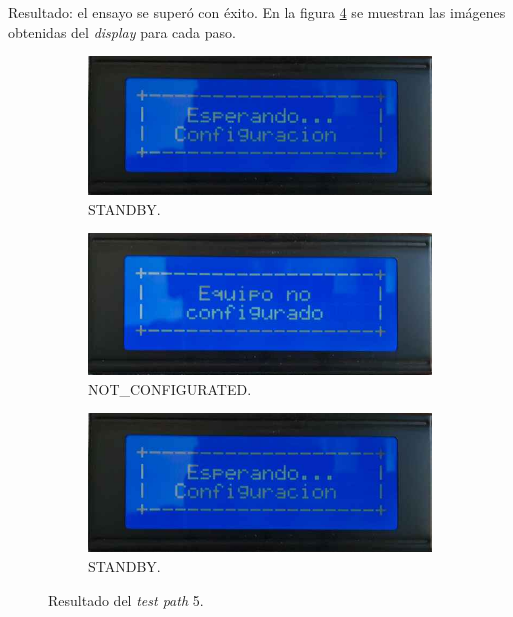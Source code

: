 Resultado: el ensayo se superó con éxito. En la figura \ref{fig:pruConf_5_res} se muestran las imágenes obtenidas del \textit{display} para cada paso.

\begin{figure}[!htpb]
     \centering
     \begin{subfigure}[b]{0.4\textwidth}
         \centering
         \includegraphics[width=1.1\textwidth]{./Figures/Esp_Conf.jpeg}
         \caption{STANDBY.}
         \label{fig:pruConf_5_1}
     \end{subfigure}
           \hfill
     \begin{subfigure}[b]{0.4\textwidth}
         \centering
         \includegraphics[width=1.1\textwidth]{./Figures/Eq_no_conf.jpeg}
         \caption{NOT\_CONFIGURATED.}
         \label{fig:pruConf_5_2}
     \end{subfigure}
           \hfill
     \begin{subfigure}[b]{0.4\textwidth}
         \centering
         \includegraphics[width=1.1\textwidth]{./Figures/Esp_Conf.jpeg}
         \caption{STANDBY.}
         \label{fig:pruConf_5_3}
     \end{subfigure}
        \caption{Resultado del \textit{test path} 5.}
        \label{fig:pruConf_5_res}
\end{figure}

